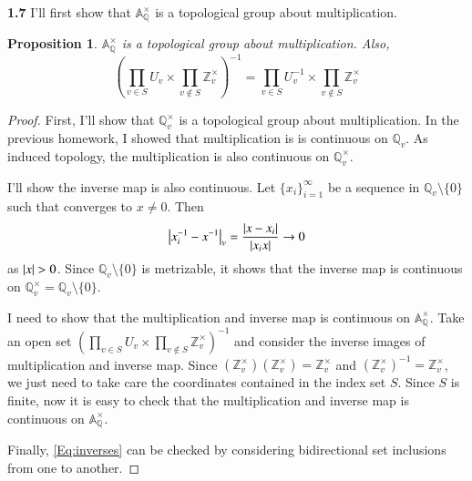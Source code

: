 \documentclass[a4paper, 12pt]{article}
\theoremstyle{Mydefinition}
\theoremstyle{Mytheorem}
\newtheorem{proposition}[statement]{Proposition}
\begin{document}
\noindent \textbf{1.7}
I'll first show that $\mathbb{A}_\mathbb{Q}^\times$ is a topological group about multiplication.
\begin{proposition}
    $\mathbb{A}_\mathbb{Q}^\times$ is a topological group about multiplication. Also,
    \begin{equation}
        \left(\prod_{v\in S}U_v\times \prod_{v\not\in S}\mathbb{Z}_v^\times\right)^{-1}=\prod_{v\in S}U_v^{-1}\times \prod_{v\not\in S}\mathbb{Z}_v^\times
    \end{equation}
\end{proposition}
\begin{proof}
First, I'll show that $\mathbb{Q}_v^\times$ is a topological group about multiplication. In the previous homework, I showed that multiplication is is continuous on $\mathbb{Q}_v$. As induced topology, the multiplication is also continuous on $\mathbb{Q}_v^\times$.

I'll show the inverse map is also continuous. Let $\{x_i\}_{i=1}^\infty$ be a sequence in $\mathbb{Q}_v\setminus\{0\}$ such that converges to $x\neq 0$. Then
\begin{equation}\label{Eq:inverses}
    \abs{x_i^{-1}-x^{-1}}_v = \frac{\abs{x-x_i}}{\abs{x_ix}}\rightarrow 0
\end{equation}
as $\abs{x}>0$. Since $\mathbb{Q}_v\setminus\{0\}$ is metrizable, it shows that the inverse map is continuous on $\mathbb{Q}_v^\times = \mathbb{Q}_v\setminus\{0\}$.

I need to show that the multiplication and inverse map is continuous on $\mathbb{A}_\mathbb{Q}^\times$. Take an open set $\left(\prod_{v\in S}U_v\times \prod_{v\not\in S}\mathbb{Z}_v^\times\right)^{-1}$ and consider the inverse images of multiplication and inverse map. Since $(\mathbb{Z}_v^\times)(\mathbb{Z}_v^\times) = \mathbb{Z}_v^\times$ and $\left(\mathbb{Z}_v^\times\right)^{-1} = \mathbb{Z}_v^\times$, we just need to take care the coordinates contained in the index set $S$. Since $S$ is finite, now it is easy to check that the multiplication and inverse map is continuous on $\mathbb{A}_\mathbb{Q}^\times$.

Finally, \eqref{Eq:inverses} can be checked by considering bidirectional set inclusions from one to another.
\end{proof}
\end{document}
